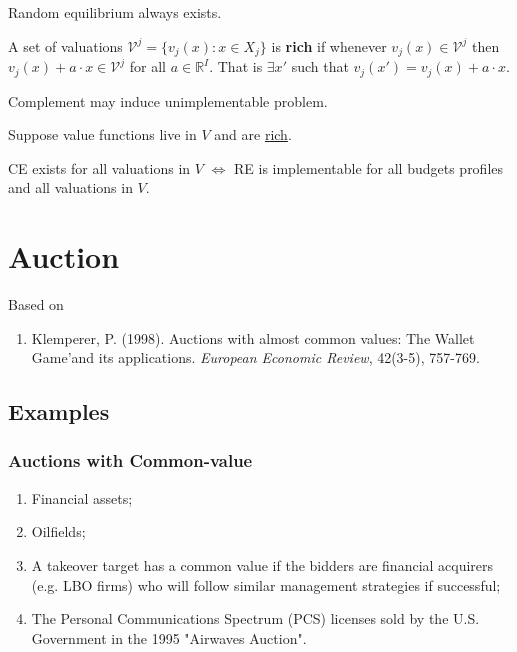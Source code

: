 \documentclass[11pt]{elegantbook}
\begin{document}
\begin{proposition}
    Random equilibrium always exists.
\end{proposition}

\begin{definition}[Rich]
    \normalfont
    A set of valuations $\mathcal{V}^j=\{v_j(x):x\in X_j\}$ is \textbf{rich} if whenever $v_j(x)\in \mathcal{V}^j$ then $v_j(x)+a\cdot x\in \mathcal{V}^j$ for all $a\in \mathbb{R}^I$. That is $\exists x'$ such that $v_j(x')=v_j(x)+a\cdot x$.
\end{definition}
Complement may induce unimplementable problem.

Suppose value functions live in $V$ and are \underline{rich}.
\begin{theorem}
    CE exists for all valuations in $V$ $\Leftrightarrow$ RE is implementable for all budgets profiles and all valuations in $V$.
\end{theorem}


\chapter{Auction}
Based on
\begin{enumerate}[$\circ$]
    \item Klemperer, P. (1998). Auctions with almost common values: The Wallet Game'and its applications. \textit{European Economic Review}, 42(3-5), 757-769.
\end{enumerate}


\section{Examples}
\subsection{Auctions with Common-value}
\begin{enumerate}[(1).]
    \item Financial assets;
    \item Oilfields;
    \item A takeover target has a common value if the bidders are financial acquirers (e.g. LBO firms) who will follow similar management strategies if successful;
    \item The Personal Communications Spectrum (PCS) licenses sold by the U.S. Government in the 1995 "Airwaves Auction".
\end{enumerate}
\end{document}
